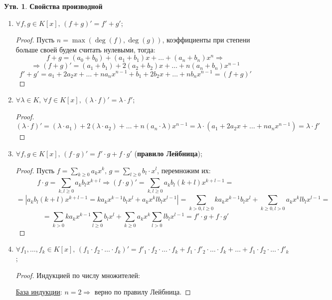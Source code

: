 \documentclass[12pt]{article}
\theoremstyle{definition}
\newtheorem{prop}{Утв.}
\newcommand{\ddsum}[2]{\displaystyle\sum\limits_{#1}^{#2}}
\begin{document}
\begin{prop}\textbf{Свойства производной}
	\begin{enumerate}[label=\arabic*)]
		\item $\forall f,g \in K[x], \, (f + g)' = f' + g'$;
		\begin{proof}
			Пусть $n = \max(\deg(f),\deg(g))$, коэффициенты при степени больше своей будем считать нулевыми, тогда:
			$$
				f + g = (a_0 + b_0) + (a_1 + b_1)x + \dotsc + (a_n + b_n)x^n \Rightarrow 
			$$
			$$
				\Rightarrow (f + g)' = (a_1 + b_1) + 2(a_2 + b_2)x + \dotsc + n(a_n + b_n)x^{n-1}
			$$
			$$
				f' + g' = a_1 + 2a_2x + \dotsc + na_{n}x^{n-1} + b_1 + 2b_2x + \dotsc + nb_{n}x^{n-1} = (f + g)'
			$$
		\end{proof}
		\item $\forall \lambda \in K, \, \forall f \in K[x], \, (\lambda{\cdot}f)' = \lambda{\cdot}f'$;
		\begin{proof}
			$$
				(\lambda{\cdot}f)' = (\lambda{\cdot}a_1) + 2(\lambda{\cdot}a_2) + \dotsc + n(a_n{\cdot}\lambda)x^{n-1} = \lambda{\cdot}(a_1 + 2a_2x + \dotsc + na_{n}x^{n-1}) = \lambda{\cdot}f'
			$$
		\end{proof}
		\item $\forall f,g \in K[x], \, (f{\cdot}g)' = f'{\cdot}g + f{\cdot}g'$ (\textbf{правило Лейбница});
		\begin{proof}
			Пусть $f = \ddsum{k \geq 0}{}a_kx^{k}, \, g = \ddsum{l \geq 0}{}b_l{\cdot}x^l$, перемножим их:
			$$
				f{\cdot}g = \ddsum{k,l \geq 0}{}a_kb_lx^{k + l} \Rightarrow (f{\cdot}g)' = \ddsum{k,l \geq 0}{}a_kb_l(k+l)x^{k+l -1} = 
			$$
			$$
				= \left|a_kb_l(k+l)x^{k+l -1} = ka_kx^{k-1}b_lx^l + a_kx^klb_lx^{l-1}\right| = \ddsum{k > 0, l \geq0}{}ka_kx^{k-1}b_lx^l + \ddsum{k\geq0,l > 0}{}a_kx^klb_lx^{l-1} = 
			$$
			$$
				= \ddsum{k > 0}{}ka_kx^{k-1}\ddsum{l \geq 0}{}b_lx^l + \ddsum{k\geq0}{}a_kx^k\ddsum{l > 0}{}lb_lx^{l-1} = f'{\cdot}g + f{\cdot}g'
			$$
		\end{proof}
		\item $\forall f_1,\dotsc,f_k \in K[x], \, (f_1{\cdot}f_2{\cdot}\dotsc{\cdot}f_k)' = f'_1{\cdot}f_2{\cdot}\dotsc{\cdot}f_k + f_1{\cdot}f'_2{\cdot}\dotsc{\cdot}f_k + \dotsc + f_1{\cdot}f_2{\cdot}\dotsc{\cdot}f'_k$;
		\begin{proof}
			Индукцией по числу множителей:
			
			\uline{База индукции}: $n = 2 \Rightarrow$ верно по правилу Лейбница.
			

\end{proof}
\end{enumerate}
\end{prop}
\end{document}
